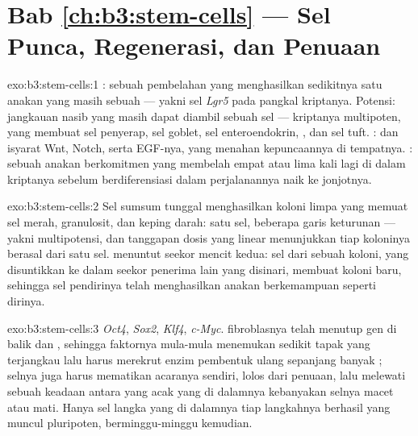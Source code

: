 \section*{Bab \ref{ch:b3:stem-cells} --- Sel Punca, Regenerasi, dan Penuaan}

\begin{solution}{exo:b3:stem-cells:1}
: sebuah pembelahan yang menghasilkan sedikitnya satu anakan yang
masih sebuah  --- yakni sel \emph{Lgr5} pada pangkal kriptanya. Potensi:
jangkauan nasib yang masih dapat diambil sebuah sel ---  kriptanya
multipoten, yang membuat sel penyerap, sel goblet, sel enteroendokrin, ,
dan sel tuft. :  dan isyarat Wnt, Notch, serta EGF-nya,
yang menahan kepuncaannya di tempatnya. : sebuah
anakan berkomitmen yang membelah empat atau lima kali lagi di dalam kriptanya
sebelum berdiferensiasi dalam perjalanannya naik ke jonjotnya.
\end{solution}

\begin{solution}{exo:b3:stem-cells:2}
Sel sumsum tunggal menghasilkan koloni limpa yang memuat sel merah,
granulosit, dan keping darah: satu sel, beberapa garis keturunan ---
yakni multipotensi, dan tanggapan dosis yang linear menunjukkan tiap koloninya berasal dari
satu sel.  menuntut seekor mencit kedua: sel dari sebuah koloni,
yang disuntikkan ke dalam seekor penerima lain yang disinari, membuat koloni baru, sehingga
sel pendirinya telah menghasilkan anakan berkemampuan seperti dirinya.
\end{solution}

\begin{solution}{exo:b3:stem-cells:3}
\emph{Oct4}, \emph{Sox2}, \emph{Klf4}, \emph{c-Myc}.  fibroblasnya
telah menutup gen  di balik  dan
, sehingga faktornya mula-mula menemukan sedikit tapak yang terjangkau lalu
harus merekrut enzim pembentuk ulang sepanjang banyak ; selnya juga harus
mematikan acaranya sendiri, lolos dari penuaan, lalu melewati sebuah
keadaan antara yang acak yang di dalamnya kebanyakan selnya macet atau mati. Hanya
sel langka yang di dalamnya tiap langkahnya berhasil yang muncul pluripoten, berminggu-minggu
kemudian.
\end{solution}


